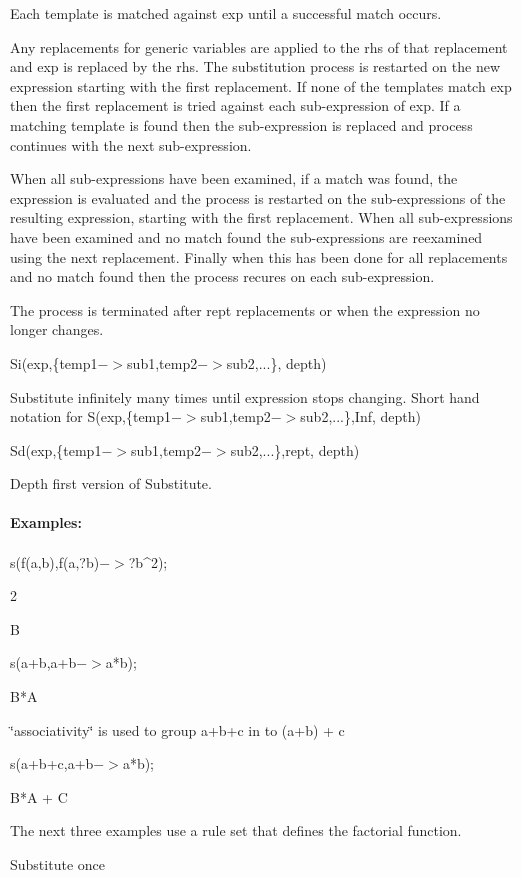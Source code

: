 \documentclass{article}
\begin{document}
Each template is matched against exp until a successful match occurs.

Any replacements for generic variables are applied to the rhs of that
replacement and exp is replaced by the rhs. The substitution process is
restarted on the new expression starting with the first replacement. If
none of the templates match exp then the first replacement is tried
against each sub-expression of exp. If a matching template is found
then the sub-expression is replaced and process continues with the next
sub-expression.

When all sub-expressions have been examined, if a match was found, the
expression is evaluated and the process is restarted on the
sub-expressions of the resulting expression, starting with the first
replacement. When all sub-expressions have been examined and no match
found the sub-expressions are reexamined using the next replacement.
Finally when this has been done for all replacements and no match found
then the process recures on each sub-expression.


The process is terminated after rept replacements or when the expression
no longer changes.



Si(exp,\{temp1$->$sub1,temp2$->$sub2,...\}, depth)


Substitute infinitely many times until expression stops changing.
Short hand notation for S(exp,\{temp1$->$sub1,temp2$->$sub2,...\},Inf,
depth)


Sd(exp,\{temp1$->$sub1,temp2$->$sub2,...\},rept, depth)


Depth first version of Substitute.\\
\ \\
{\bf Examples:} \\
\ \\
 s(f(a,b),f(a,?b)$->$?b\^{}2);

 2

 B



 s(a+b,a+b$->$a{*}b);

 B{*}A



 \char`\"{}associativity\char`\"{} is used to group a+b+c in to (a+b)
+ c

 s(a+b+c,a+b$->$a{*}b);

 B{*}A + C


The next three examples use a rule set that defines the factorial function.

Substitute once
\end{document}
